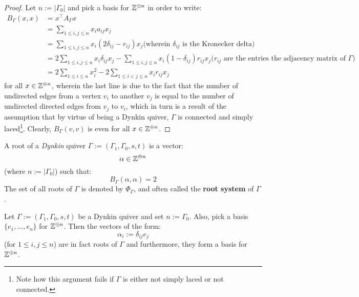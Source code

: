                 \begin{proof}
                    Let $n := |\Gamma_0|$ and pick a basis for $\mathbb{Z}^{\oplus n}$ in order to write:
                        $$
                            \begin{aligned}
                                B_{\Gamma}(x, x) & = x^{\top} A_{\Gamma} x
                                \\
                                & = \sum_{1 \leq i, j \leq n} x_i a_{ij} x_j
                                \\
                                & = \sum_{1 \leq i, j \leq n} x_i (2\delta_{ij} - r_{ij}) x_j \text{(wherein $\delta_{ij}$ is the Kronecker delta)}
                                \\
                                & = 2\sum_{1 \leq i, j \leq n} x_i \delta_{ij} x_j - \sum_{1 \leq i, j \leq n} x_i (1 - \delta_{ij}) r_{ij} x_j \text{($r_{ij}$ are the entries the adjacency matrix of $\Gamma$)}
                                \\
                                & = 2\sum_{1 \leq i \leq n} x_i^2 - 2\sum_{1 \leq i < j \leq n} x_i r_{ij} x_j
                            \end{aligned}
                        $$
                    for all $x \in \mathbb{Z}^{\oplus n}$, wherein the last line is due to the fact that the number of undirected edges from a vertex $v_i$ to another $v_j$ is equal to the number of undirected directed edges from $v_j$ to $v_i$, which in turn is a result of the assumption that by virtue of being a Dynkin quiver, $\Gamma$ is connected and simply laced\footnote{Note how this argument fails if $\Gamma$ is either not simply laced or not connected.}. Clearly, $B_{\Gamma}(v, v)$ is even for all $x \in \mathbb{Z}^{\oplus n}$.
                \end{proof}
            \begin{definition}[Roots] \label{def: roots_of_dynkin_quivers}
                A root of a \textit{Dynkin} quiver $\Gamma := (\Gamma_1, \Gamma_0, s, t)$ is a vector:
                    $$\alpha \in \mathbb{Z}^{\oplus n}$$
                (where $n := |\Gamma_0|$) such that:
                    $$B_{\Gamma}(\alpha, \alpha) = 2$$
                The set of all roots of $\Gamma$ is denoted by $\Phi_{\Gamma}$, and often called the \textbf{root system} of $\Gamma$.
            \end{definition}
            \begin{example} \label{example: simple_roots}
                Let $\Gamma := (\Gamma_1, \Gamma_0, s, t)$ be a Dynkin quiver and set $n := \Gamma_0$. Also, pick a basis $\{e_1, ..., e_n\}$ for $\mathbb{Z}^{\oplus n}$. Then the vectors of the form:
                    $$\alpha_i := \delta_{ij} e_j$$
                (for $1 \leq i, j \leq n$) are in fact roots of $\Gamma$ and furthermore, they form a basis for $\mathbb{Z}^{\oplus n}$.
            \end{example}
